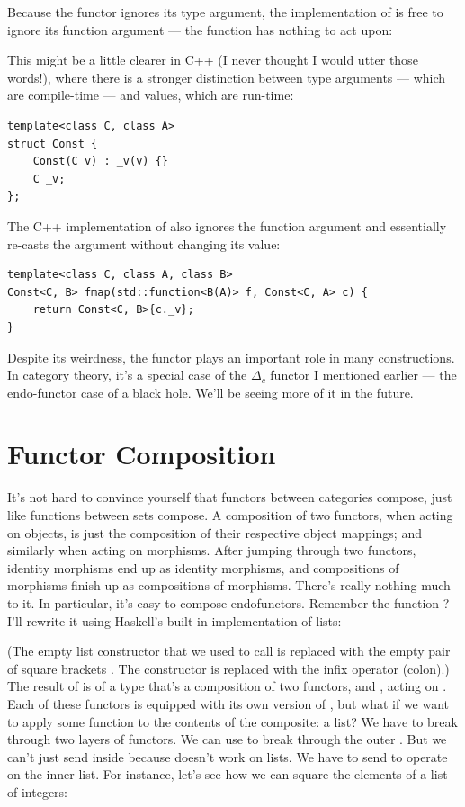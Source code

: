Because the functor ignores its type argument, the implementation of
 is free to ignore its function argument --- the function
has nothing to act upon:

This might be a little clearer in C++ (I never thought I would utter
those words!), where there is a stronger distinction between type
arguments --- which are compile-time --- and values, which are run-time:

\begin{Verbatim}
template<class C, class A>
struct Const { 
    Const(C v) : _v(v) {}
    C _v;
};
\end{Verbatim}
The C++ implementation of  also ignores the function
argument and essentially re-casts the  argument without
changing its value:

\begin{Verbatim}
template<class C, class A, class B>
Const<C, B> fmap(std::function<B(A)> f, Const<C, A> c) {
    return Const<C, B>{c._v};
}
\end{Verbatim}
Despite its weirdness, the  functor plays an important
role in many constructions. In category theory, it's a special case of
the $\Delta_c$ functor I mentioned earlier --- the endo-functor
case of a black hole. We'll be seeing more of it in the future.

\section{Functor Composition}

It's not hard to convince yourself that functors between categories
compose, just like functions between sets compose. A composition of two
functors, when acting on objects, is just the composition of their
respective object mappings; and similarly when acting on morphisms.
After jumping through two functors, identity morphisms end up as
identity morphisms, and compositions of morphisms finish up as
compositions of morphisms. There's really nothing much to it. In
particular, it's easy to compose endofunctors. Remember the function
? I'll rewrite it using Haskell's built in
implementation of lists:

(The empty list constructor that we used to call  is
replaced with the empty pair of square brackets \code{{[}{]}}. The
 constructor is replaced with the infix operator \code{:}
(colon).) The result of  is of a type that's a
composition of two functors,  and \code{{[}{]}}, acting
on . Each of these functors is equipped with its own version
of , but what if we want to apply some function 
to the contents of the composite: a  list? We have to
break through two layers of functors. We can use  to break
through the outer . But we can't just send 
inside  because  doesn't work on lists. We have
to send  to operate on the inner list. For instance,
let's see how we can square the elements of a  list of
integers:

